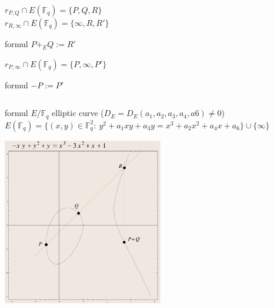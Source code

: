 \documentclass[handout]{beamer}%
\newcommand{\F}{\mathbb F}
\theoremstyle{definition}
\begin{document}
\begin{frame}
\begin{columns}[c]
\begin{column}{6.5cm}
\begin{center}
\pause
\end{center}
\small{\vspace*{-2mm}
$r_{P,Q}\cap E(\F_q)=\{P,Q,R\}$\pause\\
$r_{R,\infty}\cap E(\F_q)=\{\infty,R,R'\}$}
{\begin{beamercolorbox}[shadow=true,center,wd=2cm]{formul}
$P+_E Q:=R'$\pause
            \end{beamercolorbox}}%

 \small{$r_{P,\infty}\cap E(\F_q)=\{P,\infty,P'\}$}
 {\begin{beamercolorbox}[shadow=true,center,wd=2cm]{formul}
             $-P:=P'$
            \end{beamercolorbox}}

\end{column}
\end{columns}
\end{frame}

\begin{frame}
\begin{beamercolorbox}[shadow=true,left,rounded=true,wd=12cm]{formul}
$E/\F_q$ elliptic curve ($D_E=D_E(a_1,a_2,a_3,a_4,a6)\neq0$)\\
$E(\F_q)=\{(x,y)\in \F_q^2:\ y^2+a_1xy+a_3y=x^3+a_2x^2+a_4x+a_6\}\cup\{\infty\}$
\end{beamercolorbox}

\includegraphics[width=7cm]{images/add7.pdf}
\end{frame}
\end{document}
